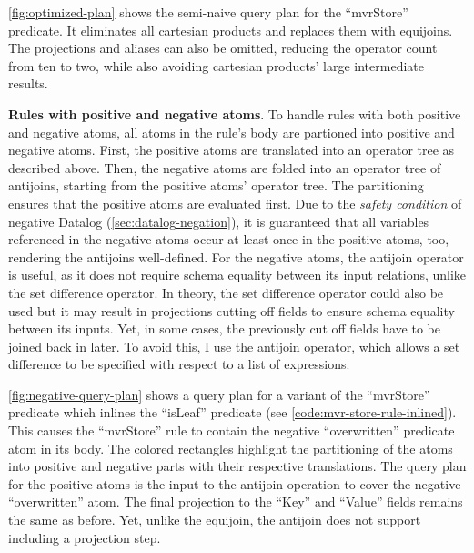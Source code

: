 \ref{fig:optimized-plan} shows the semi-naive query plan for the ``mvrStore''
predicate.
It eliminates all cartesian products and replaces them with equijoins.
The projections and aliases can also be omitted, reducing the operator count
from ten to two,
while also avoiding cartesian products' large intermediate results.



\textbf{Rules with positive and negative atoms}.
To handle rules with both positive and negative atoms,
all atoms in the rule's body are partioned into positive and negative atoms.
First, the positive atoms are translated into an operator tree as described above.
Then, the negative atoms are folded into an operator tree of antijoins,
starting from the positive atoms' operator tree.
The partitioning ensures that the positive atoms are evaluated first.
Due to the \emph{safety condition} of negative Datalog (\ref{sec:datalog-negation}),
it is guaranteed that all variables referenced in the negative atoms occur
at least once in the positive atoms, too, rendering the antijoins well-defined.
For the negative atoms, the antijoin operator is useful, as it does not
require schema equality between its input relations, unlike the set difference operator.
In theory, the set difference operator could also be used but it may result
in projections cutting off fields to ensure schema equality between its inputs.
Yet, in some cases, the previously cut off fields have to be joined back in later.
To avoid this, I use the antijoin operator, which allows a set difference
to be specified with respect to a list of expressions.

\ref{fig:negative-query-plan} shows a query plan for a variant of the
``mvrStore'' predicate which inlines the ``isLeaf'' predicate
(see \ref{code:mvr-store-rule-inlined}).
This causes the ``mvrStore'' rule to contain the negative ``overwritten''
predicate atom in its body.
The colored rectangles highlight the partitioning of the atoms into positive
and negative parts with their respective translations.
The query plan for the positive atoms is the input to the antijoin operation
to cover the negative ``overwritten'' atom.
The final projection to the ``Key'' and ``Value'' fields remains the same as
before.
Yet, unlike the equijoin, the antijoin does not support including a projection
step.


